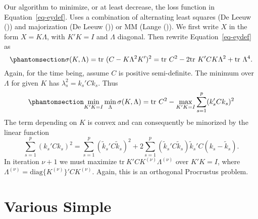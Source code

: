 \documentclass[
  12pt,
  letterpaper,
  DIV=11,
  numbers=noendperiod]{scrartcl}
\newcommand{\sectionbreak}{\clearpage}
\begin{document}
Our algorithm to minimize, or at least decrease, the loss function in
Equation~\ref{eq-eydef}. Uses a combination of alternating least squares
(De Leeuw ()) and majorization (De
Leeuw ()) or MM (Lange
()). We first write \(X\) in the form
\(X=K\Lambda\), with \(K'K=I\) and \(\Lambda\) diagonal. Then rewrite
Equation~\ref{eq-eydef} as
\begin{equation}\phantomsection\label{eq-eydefkl}{
\sigma(K,\Lambda)=\text{tr}\ (C-K\Lambda^2 K')^2=\text{tr}\ C^2-2\text{tr}\ K'CK\Lambda^2+\text{tr}\ \Lambda^4.
}\end{equation} Again, for the time being, assume \(C\) is positive
semi-definite. The minimum over \(\Lambda\) for given \(K\) has
\(\lambda_s^2=k_s'Ck_s\). Thus
\begin{equation}\phantomsection\label{eq-eydefklexpmin}{
\min_{K'K=I}\min_\Lambda\sigma(K,\Lambda)=\text{tr}\ C^2-\max_{K'K=I}\sum_{s=1}^p (k_s'Ck_s)^2
}\end{equation} The term depending on \(K\) is convex and can
consequently be minorized by the linear function \[
\sum_{s=1}^p (k_s'Ck_s)^2=\sum_{s=1}^p (\tilde k_s'C\tilde k_s)^2+2\sum_{s=1}^p (\tilde k_s'C\tilde k_s)\tilde k_s'C(k_s-\tilde k_s).
\] In iteration \(\nu + 1\) we must maximize
\(\text{tr}\ K'CK^{(\nu)}\Lambda^{(\nu)}\) over \(K'K=I\), where
\(\Lambda^{(\nu)}=\text{diag}\{K^{(\nu)}\}'CK^{(\nu)}\). Again, this is
an orthogonal Procrustus problem.

\sectionbreak

\section{Various Simple}\label{various-simple}
\end{document}
